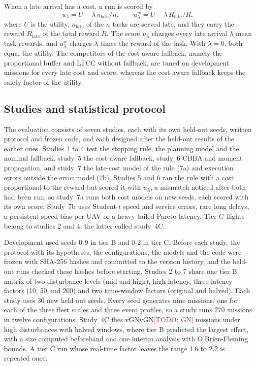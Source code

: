 \documentclass[a4paper,fleqn]{cas-dc}
\newcommand{\todo}[1]{\textcolor{red}{[TODO: #1]}}
\newcommand{\mname}{LTCC}  %
\newcommand{\val}[1]{\ifcsname v#1\endcsname\csname v#1\endcsname\else\todo{#1}\fi}
\newcounter{prop}
\begin{document}
When a late arrival has a cost, a run is scored by
\begin{equation}\label{eq:score}
u_\lambda=U-\lambda\,n_{\mathrm{late}}/n,\qquad u^w_\lambda=U-\lambda\,R_{\mathrm{late}}/R,
\end{equation}
where $U$ is the utility, $n_{\mathrm{late}}$ of the $n$ tasks are served late, and they carry the reward
$R_{\mathrm{late}}$ of the total reward $R$. The score $u_\lambda$ charges every late arrival $\lambda$ mean task
rewards, and $u^w_\lambda$ charges $\lambda$ times the reward of the task. With $\lambda=0$, both equal the utility. The
competitors of the cost-aware fallback, namely the proportional buffer and \mname{} without fallback, are tuned on
development missions for every late cost and score, whereas the cost-aware fallback keeps the safety factor of the
utility.

\subsection{Studies and statistical protocol}\label{sec:protocol}
The evaluation consists of seven studies, each with its own held-out seeds, written protocol and frozen code, and each
designed after the held-out results of the earlier ones. Studies 1 to 4 test the stopping rule, the planning model and
the nominal fallback, study~5 the cost-aware fallback, study~6 CBBA and moment propagation, and study~7 the late-cost
model of the rule (7a) and execution errors outside the error model (7b). Studies 5 and 6 ran the rule with a cost
proportional to the reward but scored it with $u_\lambda$, a mismatch noticed after both had been run, so study~7a runs
both cost models on new seeds, each scored with its own score. Study~7b uses Student-$t$ speed and service errors, rare
long delays, a persistent speed bias per UAV or a heavy-tailed Pareto latency. Tier C flights belong to studies 2 and
4, the latter called study~4C.

Development used seeds 0-9 in tier B and 0-2 in tier C. Before each study, the protocol with its hypotheses, the
configurations, the models and the code were frozen with SHA-256 hashes and committed to the version history, and the
held-out runs checked these hashes before starting. Studies 2 to 7 share one tier B matrix of two disturbance levels
(mid and high), high latency, three latency factors (10, 50 and 200) and two time-window factors (original and halved).
Each study uses 30 new held-out seeds. Every seed generates nine missions, one for each of the three fleet scales and
three event profiles, so a study runs 270 missions in twelve configurations. Study~4C flies \val{GN} missions under high
disturbances with halved windows, where tier B predicted the largest effect, with a size computed beforehand and one
interim analysis with O'Brien-Fleming bounds. A tier C run whose real-time factor leaves the range 1.6 to 2.2 is
repeated once.
\end{document}
